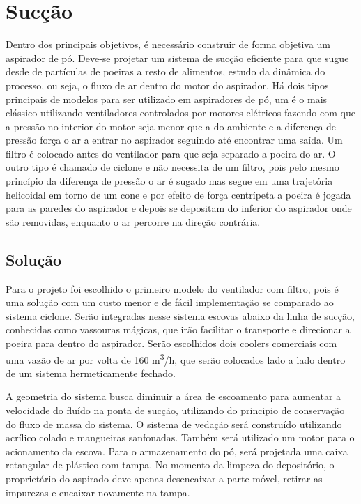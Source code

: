 
\section{Sucção} %
\label{sub:aspirador}
	
	Dentro dos principais objetivos, é necessário construir de forma objetiva um aspirador de pó. Deve-se projetar um sistema de sucção eficiente para que sugue desde de partículas de poeiras a resto de alimentos, estudo da dinâmica do processo, ou seja, o fluxo de ar dentro do motor do aspirador. Há dois tipos principais de modelos para ser utilizado em aspiradores de pó, um é o mais clássico utilizando ventiladores controlados por motores elétricos fazendo com que a pressão no interior do motor seja menor que a do ambiente e a diferença de pressão força o ar a entrar no aspirador seguindo até encontrar uma saída. Um filtro é colocado antes do ventilador para que seja separado a poeira do ar. O outro tipo é chamado de ciclone e não necessita de um filtro, pois pelo mesmo princípio da diferença de pressão o ar é sugado mas segue em uma trajetória helicoidal em torno de um cone e por efeito de força centrípeta a poeira é jogada para as paredes do aspirador e depois se depositam do inferior do aspirador onde são removidas, enquanto o ar percorre na direção contrária.

	\subsection{Solução} %
	\label{sub:solução}
		
		Para o projeto foi escolhido o primeiro modelo do ventilador com filtro, pois  é uma solução com um custo menor e de fácil implementação se comparado ao sistema ciclone. Serão integradas nesse sistema escovas abaixo da linha de sucção, conhecidas como vassouras mágicas, que irão facilitar o transporte e direcionar a poeira para dentro do aspirador. Serão escolhidos dois coolers comerciais com uma vazão de ar por volta de 160 m\textsuperscript{3}/h, que serão colocados lado a lado dentro de um sistema hermeticamente fechado.

		A geometria do sistema busca diminuir a área de escoamento para aumentar a velocidade do fluído na ponta de sucção, utilizando do principio de conservação do fluxo de massa do sistema. O sistema de vedação será construído utilizando acrílico colado e mangueiras sanfonadas. Também será utilizado um motor para o acionamento da escova. Para o armazenamento do pó, será projetada uma caixa retangular de plástico com tampa. No momento da limpeza do depositório, o proprietário do aspirado deve apenas desencaixar a parte móvel, retirar as impurezas e encaixar novamente na tampa.

